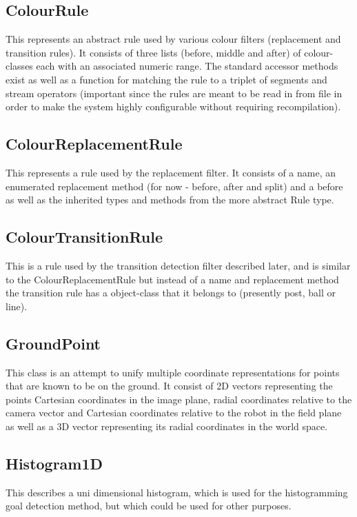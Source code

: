 \documentclass[]{report}
\begin{document}
\subsection{ColourRule}
This represents an abstract rule used by various colour filters (replacement and transition rules). It consists of three lists (before, middle and after) of colour-classes each with an associated numeric range. The standard accessor methods exist as well as a function for matching the rule to a triplet of segments and stream operators (important since the rules are meant to be read in from file in order to make the system highly configurable without requiring recompilation).
\subsection{ColourReplacementRule}
This represents a rule used by the replacement filter. It consists of a name, an enumerated replacement method (for now - before, after and split) and a before as well as the inherited types and methods from the more abstract Rule type.
\subsection{ColourTransitionRule}
This is a rule used by the transition detection filter described later, and is similar to the ColourReplacementRule but instead of a name and replacement method the transition rule has a object-class that it belongs to (presently post, ball or line).
\subsection{GroundPoint}
This class is an attempt to unify multiple coordinate representations for points that are known to be on the ground. It consist of 2D vectors representing the points Cartesian coordinates in the image plane, radial coordinates relative to the camera vector and Cartesian coordinates relative to the robot in the field plane as well as a 3D vector representing its radial coordinates in the world space.
\subsection{Histogram1D}
This describes a uni dimensional histogram, which is used for the histogramming goal detection method, but which could be used for other purposes.
\end{document}
